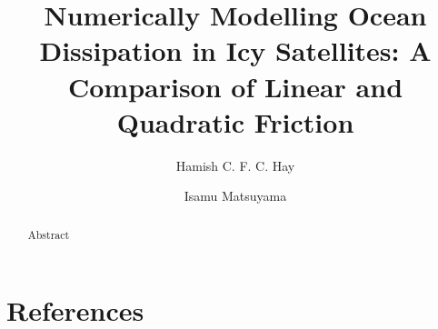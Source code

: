 \documentclass[preprint,3p,twocolumn,times,authoryear]{elsarticle}
\begin{document}
\hypersetup{
     allcolors = MidnightBlue
}

\begin{frontmatter}

\title{Numerically Modelling Ocean Dissipation in Icy Satellites: A Comparison of Linear and Quadratic Friction}

\author[label1]{Hamish C. F. C. Hay}
\author[label1]{Isamu Matsuyama}
\address[label1]{Lunar and Planetary Laboratory, University of Arizona, Tucson, AZ 85719, United States}

\begin{abstract}

\noindent Abstract

\end{abstract}
\end{frontmatter}











\section*{References}



\end{document}
